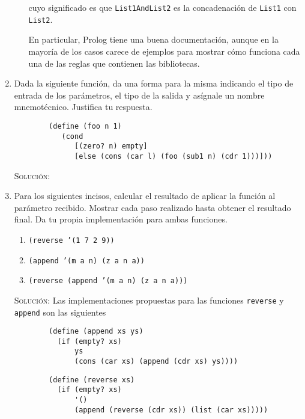 \documentclass[letterpaper,11pt]{article}
\begin{document}
\begin{enumerate}
\begin{enumerate}
        cuyo significado es que \texttt{List1AndList2} es la concadenación de 
        \texttt{List1} con \texttt{List2}. 

        En particular, Prolog tiene una buena documentación, aunque en la mayoría
        de los casos carece de ejemplos para mostrar cómo funciona cada una de 
        las reglas que contienen las bibliotecas.
    \end{enumerate}

    \item Dada la siguiente función, da una forma para la misma indicando el 
    tipo de entrada de los parámetros, el tipo de la salida y asígnale un nombre 
    mnemotécnico. Justifica tu respuesta. 
    \begin{verbatim}
        (define (foo n 1)
           (cond 
              [(zero? n) empty]
              [else (cons (car l) (foo (sub1 n) (cdr 1)))]))
    \end{verbatim}

    \textsc{Solución:}

    \item Para los siguientes incisos, calcular el resultado de aplicar la 
    función al parámetro recibido. Mostrar cada paso realizado hasta obtener el 
    resultado final. Da tu propia implementación para ambas funciones.
    \begin{enumerate}
        \item \texttt{(reverse '(1 7 2 9))}
        \item \texttt{(append '(m a n) (z a n a))}
        \item \texttt{(reverse (append '(m a n) (z a n a)))}
    \end{enumerate} 

    \textsc{Solución:} Las implementaciones propuestas para las funciones 
    \texttt{reverse} y \texttt{append} son las siguientes 
    \begin{verbatim}
        (define (append xs ys)
          (if (empty? xs)
              ys
              (cons (car xs) (append (cdr xs) ys))))
    \end{verbatim}
    \begin{verbatim}
        (define (reverse xs)
          (if (empty? xs)
              '()
              (append (reverse (cdr xs)) (list (car xs)))))
    \end{verbatim}


\end{enumerate}
\end{document}
